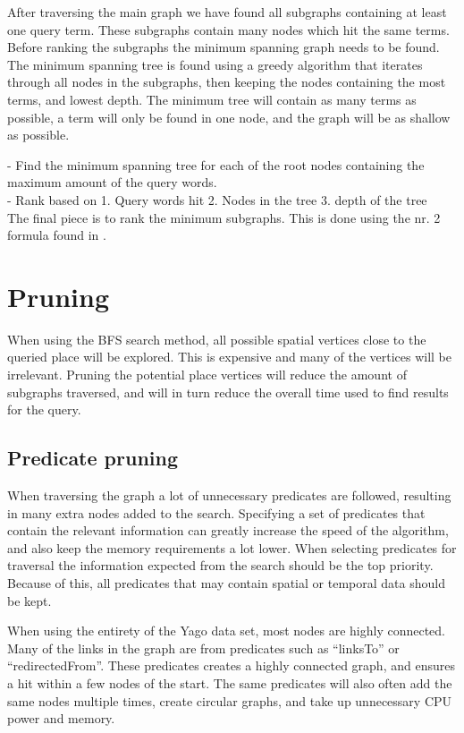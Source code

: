 After traversing the main graph we have found all subgraphs containing at least one query term. These subgraphs contain many nodes which hit the same terms. Before ranking the subgraphs the minimum spanning graph needs to be found. The minimum spanning tree is found using a greedy algorithm that iterates through all nodes in the subgraphs, then keeping the nodes containing the most terms, and lowest depth. The minimum tree will contain as many terms as possible, a term will only be found in one node, and the graph will be as shallow as possible.

- Find the minimum spanning tree for each of the root nodes containing the maximum amount of the query words.\\
- Rank based on 1. Query words hit 2. Nodes in the tree 3. depth of the tree\\
The final piece is to rank the minimum subgraphs. This is done using the nr. 2 formula found in \cite{Shi:2016:TRS:2882903.2882941}. 


\section{Pruning} \label{pruning}
When using the BFS search method, all possible spatial vertices close to the queried place will be explored. This is expensive and many of the vertices will be irrelevant. Pruning the potential place vertices will reduce the amount of subgraphs traversed, and will in turn reduce the overall time used to find results for the query.

\subsection{Predicate pruning}
When traversing the graph a lot of unnecessary predicates are followed, resulting in many extra nodes added to the search. Specifying a set of predicates that contain the relevant information can greatly increase the speed of the algorithm, and also keep the memory requirements a lot lower. When selecting predicates for traversal the information expected from the search should be the top priority. Because of this, all predicates that may contain spatial or temporal data should be kept.

When using the entirety of the Yago data set, most nodes are highly connected. Many of the links in the graph are from predicates such as ``linksTo'' or ``redirectedFrom''. These predicates creates a highly connected graph, and ensures a hit within a few nodes of the start. The same predicates will also often add the same nodes multiple times, create circular graphs, and take up unnecessary CPU power and memory.

